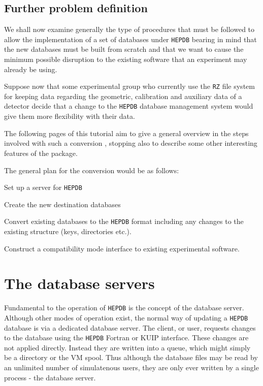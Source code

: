 \subsection{Further problem definition}
We shall now examine generally the type of procedures that must be followed
to allow the
implementation of a set of databases under {\tt HEPDB} bearing in mind
that the new databases must be built from scratch and that we want to cause
the minimum possible disruption to the existing software that an experiment may already
be using.
\par
Suppose now that some experimental group who currently use the {\tt RZ} file
system for keeping data regarding the geometric, calibration and
auxiliary data of a detector decide that a change to the {\tt HEPDB} database
management system would give them more flexibility with their data.
\par
The following pages of this tutorial aim to give a general overview in the steps
involved with such a conversion , stopping also to describe some other interesting
features of the package.
\par
The general plan for the conversion would be as follows:
\begin{OL}
\item  Set up a server for {\tt HEPDB}
\item  Create the new destination databases
\item  Convert existing databases to the {\tt HEPDB} format including any
changes to the existing structure (keys, directories etc.).
\item  Construct a compatibility mode interface to existing experimental software.
\end{OL}
%
%
%
\section{The database servers}
Fundamental to the operation of {\tt HEPDB} is the concept of
the database server. Although other modes of operation exist,
the normal way of updating a {\tt HEPDB} database is via a dedicated
database server. The client, or user, requests changes to the database
using the {\tt HEPDB} Fortran or KUIP interface. These changes are
not applied directly. Instead they are written into a queue, which
might simply be a directory or the VM spool. Thus although the database
files may be read by an unlimited number of simulatenous users, they
are only ever written by a single process - the database server.
%
%
%
